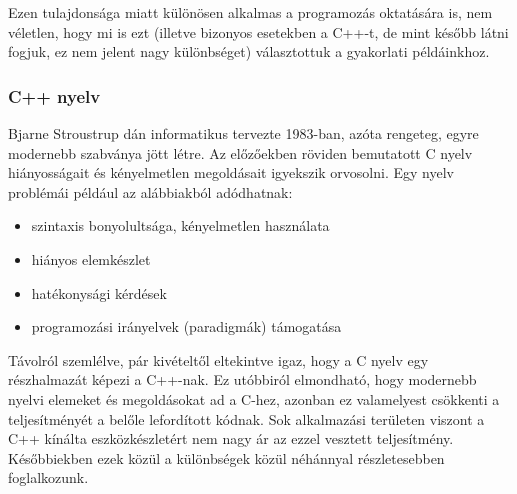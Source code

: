 Ezen tulajdonsága miatt különösen alkalmas a programozás oktatására is, nem véletlen, hogy mi is ezt (illetve bizonyos esetekben a C++-t, de mint később látni fogjuk, ez nem jelent nagy különbséget) választottuk a gyakorlati példáinkhoz. 



\subsubsection{C++ nyelv}
Bjarne Stroustrup dán informatikus tervezte 1983-ban, azóta rengeteg, egyre modernebb szabványa jött létre. Az előzőekben röviden bemutatott C nyelv hiányosságait és kényelmetlen megoldásait igyekszik orvosolni. Egy nyelv problémái például az alábbiakból adódhatnak:
\begin{itemize}
  \item szintaxis bonyolultsága, kényelmetlen használata
  \item hiányos elemkészlet
  \item hatékonysági kérdések
  \item programozási irányelvek (paradigmák) támogatása
\end{itemize}

Távolról szemlélve, pár kivételtől eltekintve igaz, hogy a C nyelv egy részhalmazát képezi a C++-nak. Ez utóbbiról elmondható, hogy modernebb nyelvi elemeket és megoldásokat ad a C-hez, azonban ez valamelyest csökkenti a teljesítményét a belőle lefordított kódnak. Sok alkalmazási területen viszont a C++ kínálta eszközkészletért nem nagy ár az ezzel vesztett teljesítmény. Későbbiekben ezek közül a különbségek közül néhánnyal részletesebben foglalkozunk.
